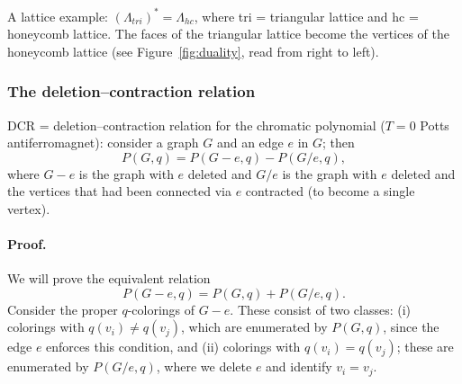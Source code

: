 A lattice example: $(\Lambda_{tri})^* = \Lambda_{hc}$, where tri = triangular lattice and hc = honeycomb lattice. The faces of the
triangular lattice become the vertices of the honeycomb lattice (see Figure~\ref{fig:duality}, read from right to left).

\subsubsection*{The deletion--contraction relation}

DCR = deletion--contraction relation for the chromatic polynomial ($T = 0$ Potts antiferromagnet): consider a graph $G$ and an
edge $e$ in $G$; then
\begin{equation}
  P(G,q) = P(G-e,q) - P(G/e,q),
\end{equation}
where $G-e$ is the graph with $e$ deleted and $G/e$ is the graph with $e$ deleted and the vertices that had been connected via
$e$ contracted (to become a single vertex).

\paragraph{Proof.} We will prove the equivalent relation
\begin{equation}
  P(G-e,q) = P(G,q) + P(G/e,q).
\end{equation}
Consider the proper $q$-colorings of $G-e$. These consist of two classes: (i) colorings with $q(v_i)\ne q(v_j)$, which are
enumerated by $P(G,q)$, since the edge $e$ enforces this condition, and (ii) colorings with $q(v_i) = q(v_j)$; these are
enumerated by $P(G/e,q)$, where we delete $e$ and identify $v_i = v_j$.

\begin{diagram}
\end{diagram}

